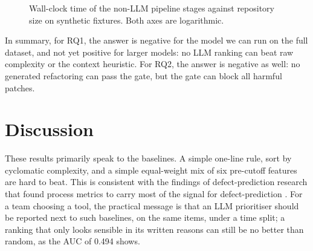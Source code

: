 \documentclass[12pt,onecolumn,draftclsnofoot]{IEEEtran}
\begin{document}
\begin{figure}[!t]
\centering
{}
\caption{Wall-clock time of the non-LLM pipeline stages against repository size on synthetic fixtures. Both axes are logarithmic.}
\label{fig:scale}
\end{figure}

In summary, for RQ1, the answer is negative for the model we can run on the full dataset, and not yet positive for larger models: no LLM ranking can beat raw complexity or the context heuristic. For RQ2, the answer is negative as well: no generated refactoring can pass the gate, but the gate can block all harmful patches.

\section{Discussion}
\label{sec:discussion}

These results primarily speak to the baselines. A simple one-line rule, sort by cyclomatic complexity, and a simple equal-weight mix of six pre-cutoff features are hard to beat. This is consistent with the findings of defect-prediction research that found process metrics to carry most of the signal for defect-prediction \cite{nagappan2005,kamei2013}. For a team choosing a tool, the practical message is that an LLM prioritiser should be reported next to such baselines, on the same items, under a time split; a ranking that only looks sensible in its written reasons can still be no better than random, as the AUC of 0.494 shows.
\end{document}

